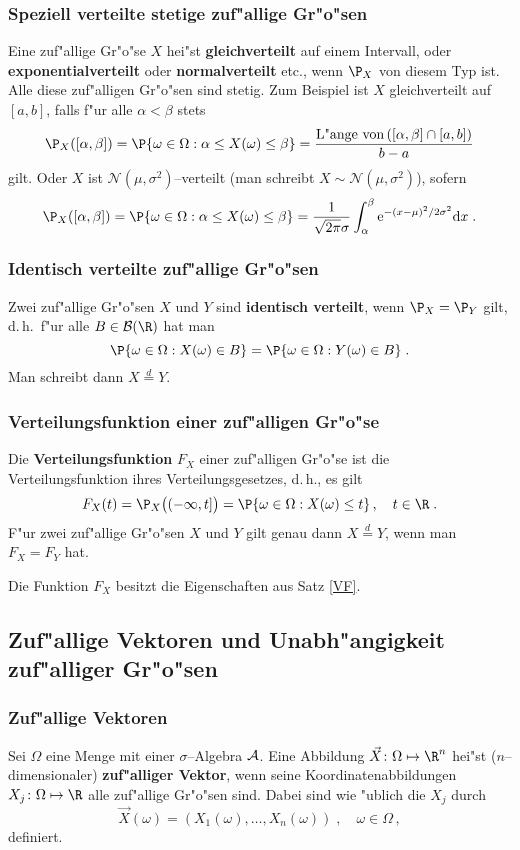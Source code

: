 \subsubsection{Speziell verteilte stetige zuf"allige Gr"o"sen}
Eine zuf"allige Gr"o"se $X$ hei"st \textbf{gleichverteilt} auf einem Intervall,
oder \textbf{exponentialverteilt} oder \textbf{normalverteilt} etc., wenn $\P_X$ von diesem Typ
ist.
Alle diese zuf"alligen Gr"o"sen sind stetig.
Zum Beispiel ist $X$ gleichverteilt auf $[a,b]$, falls f"ur alle $\alpha<\beta$
stets
$$
\P_X([\alpha,\beta])=\P\{\omega\in \Omega : \alpha\le X(\omega)\le \beta\}
=\frac{\mbox{L"ange von}\, ([\alpha,\beta]\cap[a,b])}{b-a}
$$
gilt. Oder $X$ ist $\mathcal N(\mu,\sigma^2)$--verteilt (man schreibt $X\sim \mathcal N(\mu,\sigma^2)$),
sofern
$$
\P_X([\alpha,\beta])=\P\{\omega\in \Omega : \alpha\le X(\omega)\le \beta\}=
\frac{1}{\sqrt{2\pi}\sigma}\int_\alpha^\beta \mathrm e^{-(x-\mu)^2/2\sigma^2}\mathrm d x\;.
$$
\subsubsection{Identisch verteilte zuf"allige Gr"o"sen}
Zwei zuf"allige Gr"o"sen $X$ und $Y$ sind \textbf{identisch verteilt}, wenn $\P_X=\P_Y$ gilt,
d.\,h.~f"ur alle $B\in\fr B(\R)$ hat man
$$
\P\{\omega\in \Omega : X(\omega)\in B\}= \P\{\omega\in \Omega : Y(\omega)\in B\}\;.
$$
Man schreibt dann $X\stackrel{d}{=}Y$.
\subsubsection{Verteilungsfunktion einer zuf"alligen Gr"o"se}
Die \textbf{Verteilungsfunktion} $F_X$ einer zuf"alligen Gr"o"se ist die Verteilungsfunktion
ihres Verteilungsgesetzes, d.\,h., es gilt
$$
F_X(t)=\P_X\big((-\infty,t]\big)=\P\{\omega\in\Omega : X(\omega)\le t\}\,,\quad t\in \R\;.
$$
F"ur zwei zuf"allige Gr"o"sen $X$ und $Y$ gilt genau dann $X\stackrel{d}{=}Y$, wenn man
$F_X=F_Y$ hat.

Die Funktion $F_X$ besitzt die Eigenschaften aus Satz \ref{VF}.

\subsection{Zuf"allige Vektoren und Unabh"angigkeit zuf"alliger Gr"o"sen}
\subsubsection{Zuf"allige Vektoren}
Sei $\Omega$ eine Menge mit einer $\sigma$--Algebra $\mathcal A$. Eine Abbildung $\vec X \colon \Omega\mapsto\R^n$
hei"st ($n$--dimensionaler) \textbf{zuf"alliger Vektor}, wenn seine Koordinatenabbildungen
$X_j \colon\Omega\mapsto \R$ alle zuf"allige Gr"o"sen sind. Dabei sind wie "ublich die $X_j$ durch
$$
\vec X(\omega)=(X_1(\omega),\ldots,X_n(\omega))\;,\quad \omega\in\Omega\,,
$$
definiert.

